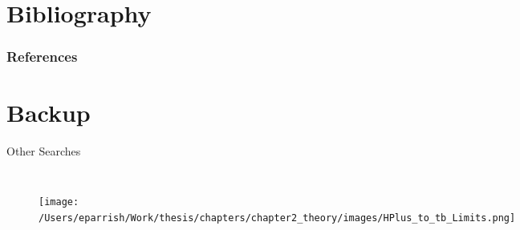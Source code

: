 \documentclass[aspectratio=169,xcolor=table]{beamer}
\begin{document}
\section{Bibliography }

  \begin{frame}[allowframebreaks]
          \frametitle{References}
          \printbibliography
  \end{frame}

\section{Backup }

   \begin{frame}[t]{Other \Hpm Searches}
    \begin{columns}
      \centering
      \begin{figure}
        \texttt{[image: /Users/eparrish/Work/thesis/chapters/chapter2\_theory/images/HPlus\_to\_tb\_Limits.png]}
        \caption{\tiny \cite{Hpm-to-tb} }
      \end{figure}
      \centering
      \begin{figure}
      \texttt{[image: /Users/eparrish/Work/thesis/chapters/chapter2\_theory/images/HPlus\_to\_cb\_Limits.png]}
      \caption{\tiny \cite{Hpm-to-cb} }
      \end{figure}
    \end{columns}
    \end{frame}
  
\end{document}
